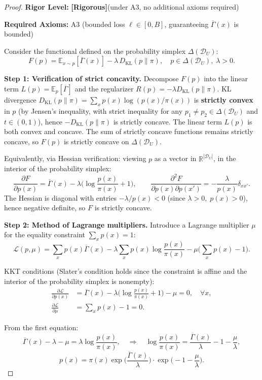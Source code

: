 \documentclass[12pt,a4paper]{article}
\newcommand{\E}{\mathbb{E}}
\newcommand{\cD}{\mathcal{D}}
\newcommand{\KL}{D_{\mathrm{KL}}}
\newcommand{\rigorous}{\textbf{[Rigorous]}}
\begin{document}
\begin{proof}
\textbf{Rigor Level:} \rigorous \quad (under A3, no additional axioms required)

\textbf{Required Axioms:} A3 (bounded loss $\ell\in[0,B]$, guaranteeing $\overline{\Gamma}(x)$ is bounded)

Consider the functional defined on the probability simplex $\Delta(\cD_U)$:
\[
F(p) = \E_{x\sim p}[\overline{\Gamma}(x)] - \lambda\,\KL(p\|\pi),\quad p\in\Delta(\cD_U),\;\lambda>0.
\]

\textbf{Step 1: Verification of strict concavity.}
Decompose $F(p)$ into the linear term $L(p)=\E_p[\overline{\Gamma}]$ and the regularizer $R(p)=-\lambda\KL(p\|\pi)$.
KL divergence $\KL(p\|\pi)=\sum_x p(x)\log(p(x)/\pi(x))$ is \textbf{strictly convex} in $p$ (by Jensen's inequality, with strict inequality for any $p_1\neq p_2\in\Delta(\cD_U)$ and $t\in(0,1)$), hence $-\KL(p\|\pi)$ is strictly concave. The linear term $L(p)$ is both convex and concave. The sum of strictly concave functions remains strictly concave, so $F(p)$ is strictly concave on $\Delta(\cD_U)$.

Equivalently, via Hessian verification: viewing $p$ as a vector in $\mathbb{R}^{|\cD_U|}$, in the interior of the probability simplex:
\[
\frac{\partial F}{\partial p(x)} = \overline{\Gamma}(x)
- \lambda\Big(\log\frac{p(x)}{\pi(x)}+1\Big),\qquad
\frac{\partial^2 F}{\partial p(x)\partial p(x')} = -\frac{\lambda}{p(x)}\delta_{xx'}.
\]
The Hessian is diagonal with entries $-\lambda/p(x)<0$ (since $\lambda>0,\;p(x)>0$), hence negative definite, so $F$ is strictly concave.

\textbf{Step 2: Method of Lagrange multipliers.}
Introduce a Lagrange multiplier $\mu$ for the equality constraint $\sum_x p(x)=1$:
\[
\mathcal{L}(p,\mu) = \sum_x p(x)\overline{\Gamma}(x)
- \lambda\sum_x p(x)\log\frac{p(x)}{\pi(x)}
- \mu\Big(\sum_x p(x)-1\Big).
\]

KKT conditions (Slater's condition holds since the constraint is affine and the interior of the probability simplex is nonempty):
\begin{align*}
\frac{\partial\mathcal{L}}{\partial p(x)}
&= \overline{\Gamma}(x)
- \lambda\Big(\log\frac{p(x)}{\pi(x)}+1\Big) - \mu = 0,\quad \forall x,\\
\frac{\partial\mathcal{L}}{\partial\mu}
&= \sum_x p(x) - 1 = 0.
\end{align*}

From the first equation:
\[
\overline{\Gamma}(x) - \lambda - \mu = \lambda\log\frac{p(x)}{\pi(x)},
\quad\Rightarrow\quad
\log\frac{p(x)}{\pi(x)} = \frac{\overline{\Gamma}(x)}{\lambda} - 1 - \frac{\mu}{\lambda},
\]
\[
p(x) = \pi(x)\exp\!\Big(\frac{\overline{\Gamma}(x)}{\lambda}\Big)
\cdot\exp\!\Big(-1-\frac{\mu}{\lambda}\Big).
\]


\end{proof}
\end{document}
